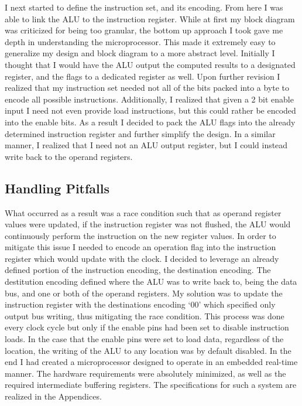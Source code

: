 \documentclass{article}
\begin{document}
I next started to define the instruction set, and its encoding. 
From here I was able to link the ALU to the instruction register. 
While at first my block diagram was criticized for being too granular, the bottom up approach I took gave me depth in understanding the microprocessor. 
This made it extremely easy to generalize my design and block diagram to a more abstract level. 
Initially I thought that I would have the ALU output the computed results to a designated register, and the flags to a dedicated register as well. 
Upon further revision I realized that my instruction set needed not all of the bits packed into a byte to encode all possible instructions. 
Additionally, I realized that given a 2 bit enable input I need not even provide load instructions, but this could rather be encoded into the enable bits. 
As a result I decided to pack the ALU flags into the already determined instruction register and further simplify the design. 
In a similar manner, I realized that I need not an ALU output register, but I could instead write back to the operand registers. 

\subsection{Handling Pitfalls}
What occurred as a result was a race condition such that as operand register values were updated, if the instruction register was not flushed, the ALU would continuously perform the instruction on the new register values. 
In order to mitigate this issue I needed to encode an operation flag into the instruction register which would update with the clock. 
I decided to leverage an already defined portion of the instruction encoding, the destination encoding. 
The destitution encoding defined where the ALU was to write back to, being the data bus, and one or both of the operand registers. 
My solution was to update the instruction register with the destinations encoding `00' which specified only output bus writing, thus mitigating the race condition. 
This process was done every clock cycle but only if the enable pins had been set to disable instruction loads. 
In the case that the enable pins were set to load data, regardless of the location, the writing of the ALU to any location was by default disabled. 
In the end I had created a microprocessor designed to operate in an embedded real-time manner. 
The hardware requirements were absolutely minimized, as well as the required intermediate buffering registers. 
The specifications for such a system are realized in the Appendices.
\end{document}
